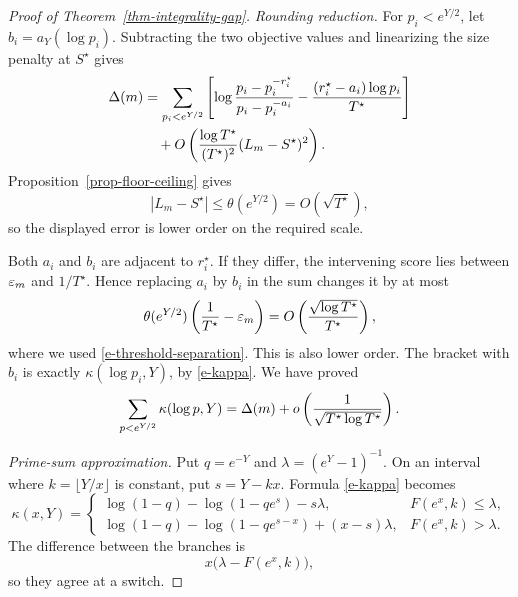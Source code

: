 \begin{proof}[Proof of Theorem~\ref{thm-integrality-gap}]
\medskip\noindent\emph{Rounding reduction.}
For \(p_i<e^{Y/2}\), let \(b_i=a_Y(\log p_i)\). Subtracting the
two objective values and linearizing the size penalty at \(S^\star\)
gives
\[
\begin{aligned}
    \Delta(m)
    &=
    \sum_{p_i<e^{Y/2}}
    \left[
        \log\frac{p_i-p_i^{-r_i^\star}}
                  {p_i-p_i^{-a_i}}
        -\frac{(r_i^\star-a_i)\log p_i}{T^\star}
    \right]\\
    &\quad
    +O\left(
        \frac{\log T^\star}{(T^\star)^2}
        (L_m-S^\star)^2
    \right).
\end{aligned}
\]
Proposition~\ref{prop-floor-ceiling} gives
\[
    |L_m-S^\star|
    \leq
    \theta(e^{Y/2})
    =
    O(\sqrt{T^\star}),
\]
so the displayed error is lower order on the required scale.

Both \(a_i\) and \(b_i\) are adjacent to \(r_i^\star\). If they differ,
the intervening score lies between \(\varepsilon_m\) and \(1/T^\star\). Hence
replacing \(a_i\) by \(b_i\) in the sum changes it by at most
\[
    \theta(e^{Y/2})
    \left(\frac1{T^\star}-\varepsilon_m\right)
    =
    O\left(\frac{\sqrt{\log T^\star}}{T^\star}\right),
\]
where we used \eqref{e-threshold-separation}. This is also lower order.
The bracket with \(b_i\) is exactly
\(\kappa(\log p_i,Y)\), by \eqref{e-kappa}.
We have proved
\[
    \sum_{p<e^{Y/2}}\kappa(\log p,Y)
    =
    \Delta(m)
    +
    o\left(\frac1{\sqrt{T^\star\log T^\star}}\right).
\]

\medskip\noindent\emph{Prime-sum approximation.}
Put \(q=e^{-Y}\) and \(\lambda=(e^Y-1)^{-1}\). On an interval where
\(k=\lfloor Y/x\rfloor\) is constant, put \(s=Y-kx\). Formula
\eqref{e-kappa} becomes
\begin{equation}
\label{e-kappa-branches}
    \kappa(x,Y)
    =
    \begin{cases}
    \log(1-q)-\log(1-qe^s)-s\lambda,
        &F(e^x,k)\leq\lambda,\\[1.5mm]
    \log(1-q)-\log(1-qe^{s-x})+(x-s)\lambda,
        &F(e^x,k)>\lambda.
    \end{cases}
\end{equation}
The difference between the branches is
\[
    x\bigl(\lambda-F(e^x,k)\bigr),
\]
so they agree at a switch.


\end{proof}
